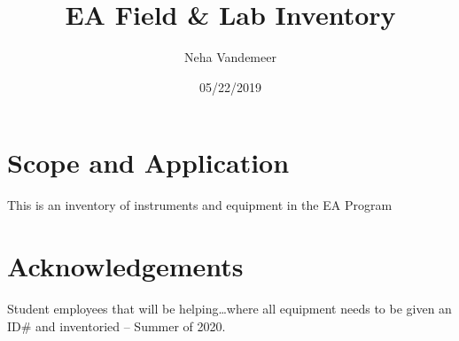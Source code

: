 \documentclass[12pt]{../SOP4_alpha}\usepackage[]{graphicx}\usepackage[]{xcolor}
\title{EA Field \& Lab Inventory}
\date{05/22/2019}
\author{Neha Vandemeer}
\begin{document}
\maketitle

\section{Scope and Application}

\NP This is an inventory of instruments and equipment in the EA Program




\tableofcontents

\newpage

\section{Acknowledgements}

Student employees that will be helping\ldots where all equipment needs to be given an ID\# and inventoried -- Summer of 2020.








\end{document}
